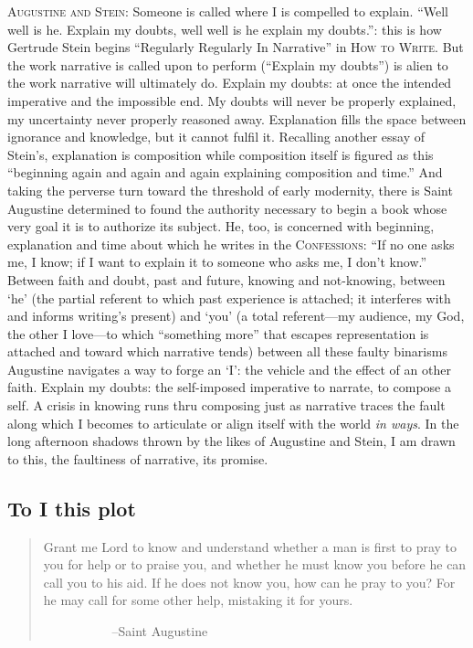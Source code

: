 \documentclass[
]{memoir}
\begin{document}
\textsc{Augustine and Stein:} Someone is called where I is compelled to
explain. ``Well well is he. Explain my doubts, well well is he explain
my doubts.'': this is how Gertrude Stein begins ``Regularly Regularly In
Narrative'' in \textsc{How to Write}. But the work narrative is called
upon to perform (``Explain my doubts'') is alien to the work narrative
will ultimately do. Explain my doubts: at once the intended imperative
and the impossible end. My doubts will never be properly explained, my
uncertainty never properly reasoned away. Explanation fills the space
between ignorance and knowledge, but it cannot fulfil it. Recalling
another essay of Stein's, explanation is composition while composition
itself is figured as this ``beginning again and again and again
explaining composition and time.'' And taking the perverse turn toward
the threshold of early modernity, there is Saint Augustine determined to
found the authority necessary to begin a book whose very goal it is to
authorize its subject. He, too, is concerned with beginning, explanation
and time about which he writes in the \textsc{Confessions}: ``If no one
asks me, I know; if I want to explain it to someone who asks me, I don't
know.'' Between faith and doubt, past and future, knowing and
not-knowing, between `he' (the partial referent to which past experience
is attached; it interferes with and informs writing's present) and `you'
(a total referent---my audience, my God, the other I love---to which
``something more'' that escapes representation is attached and toward
which narrative tends) between all these faulty binarisms Augustine
navigates a way to forge an `I': the vehicle and the effect of an other
faith. Explain my doubts: the self-imposed imperative to narrate, to
compose a self. A crisis in knowing runs thru composing just as
narrative traces the fault along which I becomes to articulate or align
itself with the world \emph{in ways}. In the long afternoon shadows
thrown by the likes of Augustine and Stein, I am drawn to this, the
faultiness of narrative, its promise.

\hypertarget{to-i-this-plot}{%
\subsection*{To I this plot}\label{to-i-this-plot}}

\begin{quote}
Grant me Lord to know and understand whether a man is first to pray to
you for help or to praise you, and whether he must know you before he
can call you to his aid. If he does not know you, how can he pray to
you? For he may call for some other help, mistaking it for yours.

~~~~~~~~~~ --Saint Augustine
\end{quote}
\end{document}
